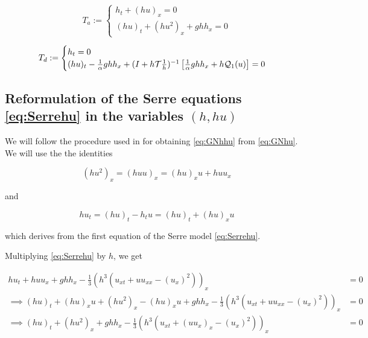 \begin{equation}
	\label{eq:splitGN1}
	T_a := \begin{cases}
		h_t + (hu)_x = 0 \\
		(hu)_t + (hu^2)_x + ghh_x = 0 
	\end{cases}	
\end{equation}

\begin{equation}
	\label{eq:splitGN2}
	T_d := \begin{cases}
		h_t = 0 \\
		(hu)_t  -\frac{1}{\alpha}ghh_x + (I + h\mathcal{T}\frac{1}{h})^{-1}\left[ \frac{1}{\alpha}ghh_x + h\mathcal{Q}_1(u) \right] = 0
	\end{cases}	
\end{equation}

\subsection{Reformulation of the Serre equations \ref{eq:Serrehu} in the variables $(h,hu)$}

\indent We will follow the procedure used in \cite{Bonneton2011} for obtaining \eqref{eq:GNhhu} from \eqref{eq:GNhu}. We will use the the identities

\begin{equation}
	\label{eq:id1}
	(hu^2)_x = (huu)_x = (hu)_xu + huu_x
\end{equation}

\noindent and

\begin{equation}
	\label{eq:id2}
	hu_t = (hu)_t - h_tu = (hu)_t +  (hu)_xu
\end{equation}

\noindent which derives from the first equation of the Serre model \eqref{eq:Serrehu}.

\indent Multiplying \eqref{eq:Serrehu} by $h$, we get

\begin{equation}
	\label{eq:serreTimesh}
	\begin{split}
		hu_t + huu_x + ghh_x - \frac{1}{3}\left(h^3 \left( u_{xt} + uu_{xx} - (u_x)^2  \right) \right)_x &= 0 \\
		\implies (hu)_t +  (hu)_xu + (hu^2)_x - (hu)_xu + ghh_x - \frac{1}{3}\left(h^3 \left( u_{xt} + uu_{xx} - (u_x)^2  \right) \right)_x &= 0 \\
		\implies (hu)_t +  (hu^2)_x  + ghh_x - \frac{1}{3}\left(h^3 \left( u_{xt} + (uu_x)_x - (u_x)^2  \right) \right)_x &= 0
	\end{split}
\end{equation}

